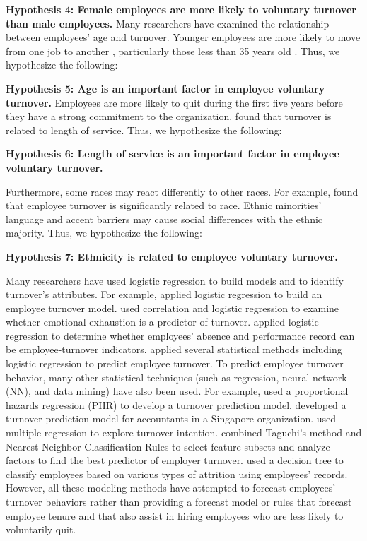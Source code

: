 \textbf{Hypothesis 4: Female employees are more likely to voluntary turnover than male employees. }
Many researchers have examined the relationship between employees’ age and turnover. Younger employees are more likely to move from one job to another \citep{burke1994}, particularly those less than 35 years old \citep{RN45}. Thus, we hypothesize the following:

\textbf{Hypothesis 5: Age is an important factor in employee voluntary turnover.}
Employees are more likely to quit during the first five years before they have a strong commitment to the organization. \citet{bluedorn1982} found that turnover is related to length of service. Thus, we hypothesize the following:

\textbf{Hypothesis 6: Length of service is an important factor in employee voluntary turnover.}

Furthermore, some races may react differently to other races. For example, \citet{RN42} found that employee turnover is significantly related to race. Ethnic minorities’ language and accent barriers may cause social differences with the ethnic majority. Thus, we hypothesize the following:

\textbf{Hypothesis 7: Ethnicity is related to employee voluntary turnover.}

Many researchers have used logistic regression to build models and to identify turnover’s attributes. For example, \citet{balfour1993} applied logistic regression to build an employee turnover model. \citet{wright1998} used correlation and logistic regression to examine whether emotional exhaustion is a predictor of turnover. \citet{morrow1999} applied logistic regression to determine whether employees’ absence and performance record can be employee-turnover indicators. \citet{nagadevara2008} applied several statistical methods including logistic regression to predict employee turnover.
To predict employee turnover behavior, many other statistical techniques (such as regression, neural network (NN), and data mining) have also been used. For example, \citet{ng1991} used a proportional hazards regression (PHR) to develop a turnover prediction model. \citet{RN6} developed a turnover prediction model for accountants in a Singapore organization. \citet{RN8} used multiple regression to explore turnover intention. \citet{RN10} combined Taguchi’s method and Nearest Neighbor Classification Rules to select feature subsets and analyze factors to find the best predictor of employer turnover. \citet{alao2013} used a decision tree to classify employees based on various types of attrition using employees’ records. However, all these modeling methods have attempted to forecast employees’ turnover behaviors rather than providing a forecast model or rules that forecast employee tenure and that also assist in hiring employees who are less likely to voluntarily quit. 

